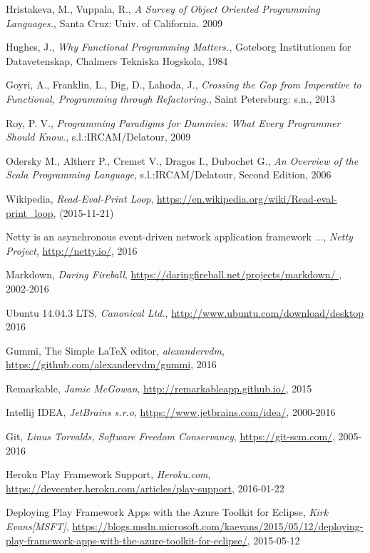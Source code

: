 \documentclass[12pt,twoside,a4paper]{report}
\begin{document}
\begin{thebibliography}{99}
Hristakeva, M., Vuppala, R.,
\emph{A Survey of Object Oriented Programming Languages.},
Santa Cruz: Univ. of California.
2009

Hughes, J.,
\emph{Why Functional Programming Matters.},
Goteborg Institutionen for Datavetenskap,
Chalmers Tekniska Hogskola, 1984


Goyri, A., Franklin, L., Dig, D., Lahoda, J.,
\emph{Crossing the Gap from Imperative to Functional, Programming through Refactoring.},
Saint Petersburg: s.n.,
2013

Roy, P. V.,
\emph{Programming Paradigms for Dummies: What Every Programmer Should Know.},
s.l.:IRCAM/Delatour,
2009

Odersky M., Altherr P., Cremet V., Dragos I., Dubochet G.,
\emph{An Overview of the Scala Programming Language},
s.l.:IRCAM/Delatour,
Second Edition,
2006

Wikipedia,
\emph{Read-Eval-Print Loop},
\url{https://en.wikipedia.org/wiki/Read-eval-print_loop},
(2015-11-21)

Netty is an asynchronous event-driven network application framework ...,
\emph{Netty Project},
\url{http://netty.io/},
2016

Markdown,
\emph{Daring Fireball},
\url{https://daringfireball.net/projects/markdown/	},
2002-2016

Ubuntu 14.04.3 LTS,
\emph{Canonical Ltd.},
\url{http://www.ubuntu.com/download/desktop}
2016

Gummi, The Simple LaTeX editor,
\emph{alexandervdm},
\url{https://github.com/alexandervdm/gummi},
2016

Remarkable,
\emph{Jamie McGowan},
\url{http://remarkableapp.github.io/},
2015

Intellij IDEA,
\emph{JetBrains s.r.o},
\url{https://www.jetbrains.com/idea/},
2000-2016

Git,
\emph{Linus Torvalds, Software Freedom Conservancy},
\url{https://git-scm.com/},
2005-2016

Heroku Play Framework Support,
\emph{Heroku.com},
\url{https://devcenter.heroku.com/articles/play-support},
2016-01-22

Deploying Play Framework Apps with the Azure Toolkit for Eclipse,
\emph{Kirk Evans[MSFT]},
\url{https://blogs.msdn.microsoft.com/kaevans/2015/05/12/deploying-play-framework-apps-with-the-azure-toolkit-for-eclipse/},
2015-05-12


\end{thebibliography}
\end{document}
